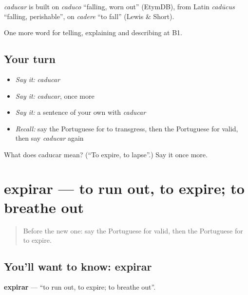 \begin{cousinweb}
\emph{caducar} is built on \emph{caduco} \textquotedblleft{}falling, worn out\textquotedblright{} (EtymDB), from Latin \emph{cadūcus} \textquotedblleft{}falling, perishable\textquotedblright{}, on \emph{cadere} \textquotedblleft{}to fall\textquotedblright{} (Lewis \& Short).
\end{cousinweb}

\begin{grammarlens}[title={What you've built}]
One more word for telling, explaining and describing at B1.
\end{grammarlens}

\subsection*{Your turn}
\begin{itemize}
\raggedright
  \item \emph{Say it:} \emph{caducar}
  \item \emph{Say it:} \emph{caducar}, once more
  \item \emph{Say it:} a sentence of your own with \emph{caducar}
  \item \emph{Recall:} say the Portuguese for to transgress, then the Portuguese for valid, then say \emph{caducar} again
\end{itemize}

\begin{tcolorbox}[breakable,colback=teal!4,colframe=teal!35!black,title={Before you move on}]
What does caducar mean? (\textquotedblleft{}To expire, to lapse\textquotedblright{}.) Say it once more.
\end{tcolorbox}
\section[expirar]{expirar — to run out, to expire; to breathe out}

\label{lesson:PT-C384-expirar}



\begin{quote}
Before the new one: say the Portuguese for valid, then the Portuguese for to expire.
\end{quote}

\subsection*{You'll want to know: expirar}
\textbf{expirar} — \textquotedblleft{}to run out, to expire; to breathe out\textquotedblright{}.

